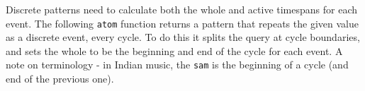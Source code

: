 Discrete patterns need to calculate both the whole and active timespans
for each event. The following \texttt{atom} function returns a pattern
that repeats the given value as a discrete event, every cycle. To do
this it splits the query at cycle boundaries, and sets the whole to be
the beginning and end of the cycle for each event. A note on terminology
- in Indian music, the \texttt{sam} is the beginning of a cycle (and end
of the previous one).

\begin{Shaded}
\begin{Highlighting}[]
  \OtherTok{{-}\textgreater{}} 
\OtherTok{=} \NormalTok{ (} \NormalTok{)}
\OtherTok{=}\NormalTok{ (} \OperatorTok{+}\NormalTok{) }

  \OtherTok{{-}\textgreater{}}\NormalTok{ [}\NormalTok{]}
\OperatorTok{|}\OperatorTok{==}\OperatorTok{||}\OperatorTok{==}\OtherTok{=}\NormalTok{ [}\NormalTok{ s e]}
                         \OperatorTok{|}  \OtherTok{=} \OperatorTok{:}
    \OtherTok{=}

\OtherTok{{-}\textgreater{}} 
\OtherTok{=}  \OperatorTok{$} \OtherTok{{-}\textgreater{}}
                              \NormalTok{ (} \OperatorTok{$} \OperatorTok{$}
\OperatorTok{$}
\NormalTok{                                    )}
\NormalTok{                           ) }
\end{Highlighting}
\end{Shaded}

